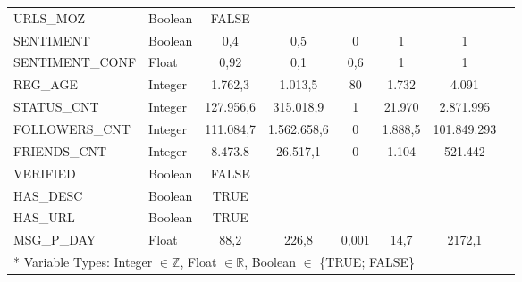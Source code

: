 \begin{appendices}
\begin{table}[H]
\begin{center}
{\begin{tabular}{l| lcccccc}
						URLS\_MOZ					& Boolean & FALSE 	  & 			 & 		 & 		   & 			\\
						SENTIMENT					& Boolean & 0,4 	  & 0,5 		 & 0 	 & 1 	   & 1			\\
						SENTIMENT\_CONF				& Float   & 0,92 	  & 0,1 		 & 0,6 	 & 1 	   & 1 			\\
						\hline
						REG\_AGE 					& Integer & 1.762,3   & 1.013,5 	 & 80 	 & 1.732   & 4.091		\\
						STATUS\_CNT 				& Integer & 127.956,6 & 315.018,9    & 1 	 & 21.970  & 2.871.995	\\ 
						FOLLOWERS\_CNT 				& Integer & 111.084,7 & 1.562.658,6  & 0 	 & 1.888,5 & 101.849.293\\ 
						FRIENDS\_CNT				& Integer & 8.473.8   & 26.517,1 	 & 0 	 & 1.104   & 521.442	\\
						VERIFIED					& Boolean & FALSE 	  & 			 & 		 & 		   & 			\\ 
						HAS\_DESC 					& Boolean & TRUE 	  & 			 & 		 & 		   & 			\\ 
						HAS\_URL					& Boolean & TRUE 	  & 			 & 		 & 		   & 			\\ 
						MSG\_P\_DAY 				& Float   & 88,2	  & 226,8 	 	 & 0,001 & 14,7	   & 2172,1		\\ 
						\hline\hline
						\multicolumn{6}{l}{* Variable Types: Integer $ \in \mathbb{Z} $, Float $ \in \mathbb{R} $, Boolean $ \in  $ \{TRUE; FALSE\} }
					\end{tabular}
				}	
			\end{center}
		\end{table}
	

\end{appendices}
